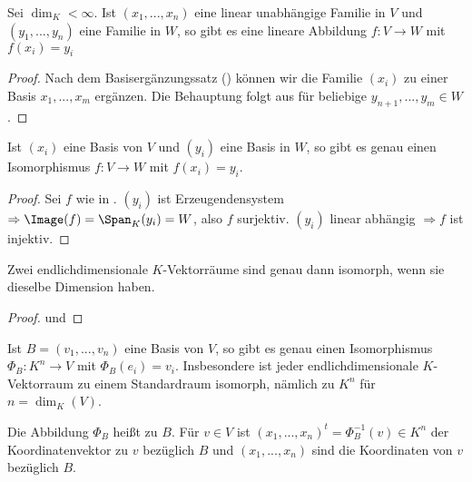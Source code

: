 \begin{conclusion}
	Sei $\dim_K<\infty$. Ist $(x_1,...,x_n)$ eine linear unabhängige Familie in $V$ und $(y_1,...,y_n)$ 
	eine Familie in $W$, so gibt es eine lineare Abbildung $f:V\to W$ mit $f(x_i)=y_i$
\end{conclusion}
\begin{proof}
	Nach dem Basisergänzungssatz () können wir die Familie $(x_i)$ zu einer Basis $x_1,...,x_m$ ergänzen. Die Behauptung 
	folgt aus  für beliebige $y_{n+1},...,y_m\in W$.
\end{proof}

\begin{conclusion}
	Ist $(x_i)$ eine Basis von $V$ und $(y_i)$ eine Basis in $W$, so gibt es genau einen Isomorphismus 
	$f:V\to W$ mit $f(x_i)=y_i$.
\end{conclusion}
\begin{proof}
	Sei $f$ wie in . $(y_i)$ ist Erzeugendensystem $\Rightarrow \Image(f)=\Span_K(y_i)=W$, also $f$ surjektiv. 
	$(y_i)$ linear abhängig $\Rightarrow f$ ist injektiv.
\end{proof}

\begin{conclusion}
	Zwei endlichdimensionale $K$-Vektorräume sind genau dann isomorph, wenn sie dieselbe Dimension haben.
\end{conclusion}
\begin{proof}
	 und 
\end{proof}

\begin{conclusion}
	Ist $B=(v_1,...,v_n)$ eine Basis von $V$, so gibt es genau einen Isomorphismus $\Phi_B:K^n\to 
	V$ mit $\Phi_B(e_i)=v_i$. Insbesondere ist jeder endlichdimensionale $K$-Vektorraum zu einem Standardraum isomorph, nämlich zu
	$K^n$ für $n=\dim_K(V)$.
\end{conclusion}

\begin{definition}[Koordinatensystem]
	Die Abbildung $\Phi_B$ heißt  zu $B$. Für $v\in V$ ist 
	$(x_1,...,x_n)^t=\Phi^{-1}_B(v)\in K^n$ der Koordinatenvektor zu $v$ bezüglich $B$ und $(x_1,...,x_n)$ sind die 
	Koordinaten von $v$ bezüglich $B$.
\end{definition}

